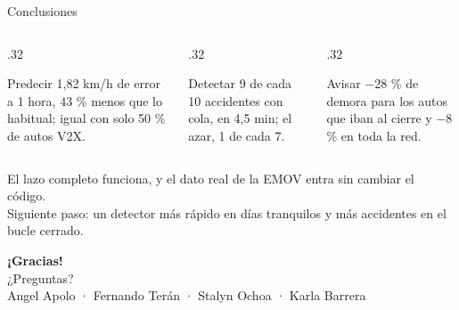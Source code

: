 \documentclass[aspectratio=169,10pt]{beamer}
\begin{document}
\begin{frame}{Conclusiones}
\begin{columns}[T]
\begin{column}{.32\textwidth}
\begin{block}{Predecir}
\small 1,82 km/h de error a 1 hora, \alert{43 \% menos} que lo habitual; igual con solo 50 \% de autos V2X.
\end{block}
\end{column}
\begin{column}{.32\textwidth}
\begin{block}{Detectar}
\small \alert{9 de cada 10} accidentes con cola, en 4,5 min; el azar, 1 de cada 7.
\end{block}
\end{column}
\begin{column}{.32\textwidth}
\begin{block}{Avisar}
\small \alert{−28 \%} de demora para los autos que iban al cierre y −8 \% en toda la red.
\end{block}
\end{column}
\end{columns}
\vspace{14pt}
\begin{center}
\alert{El lazo completo funciona, y el dato real de la EMOV entra sin cambiar el código.}\\[6pt]
{\small\color{gris}Siguiente paso: un detector más rápido en días tranquilos y más accidentes en el bucle cerrado.}
\end{center}
\end{frame}

{
\begin{frame}[plain]
\centering
\vspace{1.5cm}
{\color{white}\fontsize{34}{36}\selectfont\bfseries ¡Gracias!}\\[10pt]
{\color{white}\large ¿Preguntas?}\\[18pt]
{\color{white!80!verde}\small Angel Apolo · Fernando Terán · Stalyn Ochoa · Karla Barrera}
\end{frame}}
\end{document}
